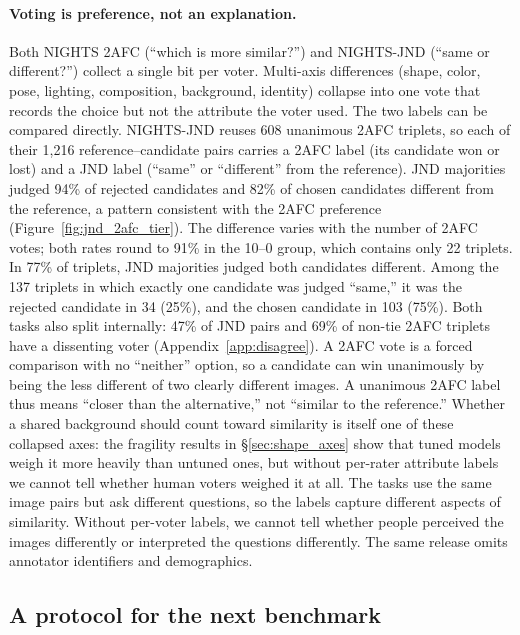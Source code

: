 \documentclass{article}
\begin{document}
\paragraph{Voting is preference, not an explanation.} Both NIGHTS 2AFC (``which is more similar?'') and NIGHTS-JND (``same or different?'') collect a single bit per voter. Multi-axis differences (shape, color, pose, lighting, composition, background, identity) collapse into one vote that records the choice but not the attribute the voter used. The two labels can be compared directly. NIGHTS-JND reuses 608 unanimous 2AFC triplets, so each of their 1{,}216 reference--candidate pairs carries a 2AFC label (its candidate won or lost) and a JND label (``same'' or ``different'' from the reference). JND majorities judged 94\% of rejected candidates and 82\% of chosen candidates different from the reference, a pattern consistent with the 2AFC preference (Figure~\ref{fig:jnd_2afc_tier}). The difference varies with the number of 2AFC votes; both rates round to 91\% in the 10--0 group, which contains only 22 triplets. In 77\% of triplets, JND majorities judged both candidates different. Among the 137 triplets in which exactly one candidate was judged ``same,'' it was the rejected candidate in 34 (25\%), and the chosen candidate in 103 (75\%). Both tasks also split internally: 47\% of JND pairs and 69\% of non-tie 2AFC triplets have a dissenting voter (Appendix~\ref{app:disagree}). A 2AFC vote is a forced comparison with no ``neither'' option, so a candidate can win unanimously by being the less different of two clearly different images. A unanimous 2AFC label thus means ``closer than the alternative,'' not ``similar to the reference.'' Whether a shared background should count toward similarity is itself one of these collapsed axes: the fragility results in \S\ref{sec:shape_axes} show that tuned models weigh it more heavily than untuned ones, but without per-rater attribute labels we cannot tell whether human voters weighed it at all. The tasks use the same image pairs but ask different questions, so the labels capture different aspects of similarity. Without per-voter labels, we cannot tell whether people perceived the images differently or interpreted the questions differently. The same release omits annotator identifiers and demographics.

\subsection{A protocol for the next benchmark}
\label{sec:protocol}
\end{document}
